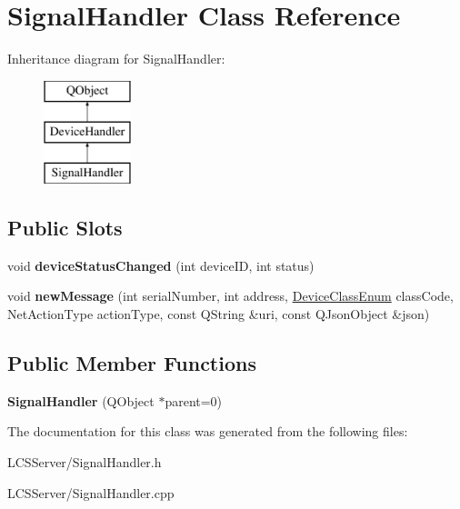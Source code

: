 \hypertarget{class_signal_handler}{}\section{Signal\+Handler Class Reference}
\label{class_signal_handler}
Inheritance diagram for Signal\+Handler\+:\begin{figure}[H]
\begin{center}
\leavevmode
\includegraphics[height=3.000000cm]{class_signal_handler}
\end{center}
\end{figure}
\subsection*{Public Slots}
\begin{DoxyCompactItemize}
\item 
\mbox{\label{class_signal_handler_acf3c282b0552de44c22bcfe917ce7ee8}} 
void {\bfseries device\+Status\+Changed} (int device\+ID, int status)
\item 
\mbox{\label{class_signal_handler_aa2bf547249bde7019c82df62dfedf7dc}} 
void {\bfseries new\+Message} (int serial\+Number, int address, \hyperlink{_global_defs_8h_ad17679fac69973be9b3a2787a60d7722}{Device\+Class\+Enum} class\+Code, Net\+Action\+Type action\+Type, const Q\+String \&uri, const Q\+Json\+Object \&json)
\end{DoxyCompactItemize}
\subsection*{Public Member Functions}
\begin{DoxyCompactItemize}
\item 
\mbox{\label{class_signal_handler_ae12a2e068be74d669d3a5678896d4b42}} 
{\bfseries Signal\+Handler} (Q\+Object $\ast$parent=0)
\end{DoxyCompactItemize}


The documentation for this class was generated from the following files\+:\begin{DoxyCompactItemize}
\item 
L\+C\+S\+Server/Signal\+Handler.\+h\item 
L\+C\+S\+Server/Signal\+Handler.\+cpp\end{DoxyCompactItemize}
